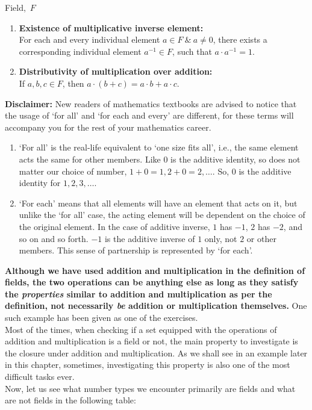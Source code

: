 \begin{Definition}{Field,\ $F$}
\begin{enumerate}
    \item \textbf{Existence of multiplicative inverse element:}\\ For each and every individual element $a\in F\ \&\ a\neq 0$, there exists a corresponding individual element $a^{-1}\in F$, such that $a\cdot a^{-1}=1$.
    \item \textbf{Distributivity of multiplication over addition:}\\ If $a,b,c\in F$, then $a\cdot(b+c)=a\cdot b+a\cdot c$.
\end{enumerate}
\end{Definition}
\bigskip
\noindent \textbf{Disclaimer:} New readers of mathematics textbooks are advised to notice that the usage of `for all' and `for each and every' are different, for these terms will accompany you for the rest of your mathematics career.
\begin{enumerate}
    \item `For all' is the real-life equivalent to `one size fits all', i.e., the same element acts the same for other members. Like $0$ is the additive identity, so does not matter our choice of number, $1+0=1,2+0=2,\dots$. So, $0$ is the additive identity for $1,2,3,\dots$.
    \item `For each' means that all elements will have an element that acts on it, but unlike the `for all' case, the acting element will be dependent on the choice of the original element. In the case of additive inverse, $1$ has $-1$, $2$ has $-2$, and so on and so forth. $-1$ is the additive inverse of $1$ only, not $2$ or other members. This sense of partnership is represented by `for each'.
\end{enumerate}
\textbf{Although we have used addition and multiplication in the definition of fields, the two operations can be anything else as long as they satisfy the \textit{properties} similar to addition and multiplication as per the definition, not necessarily  \textit{be} addition or multiplication themselves.} One such example has been given as one of the exercises.\\
Most of the times, when checking if a set equipped with the operations of addition and multiplication is a field or not, the main property to investigate is the closure under addition and multiplication. As we shall see in an example later in this chapter, sometimes, investigating this property is also one of the most difficult tasks ever.\\
\noindent Now, let us see what number types we encounter primarily are fields and what are not fields in the following table:\\
